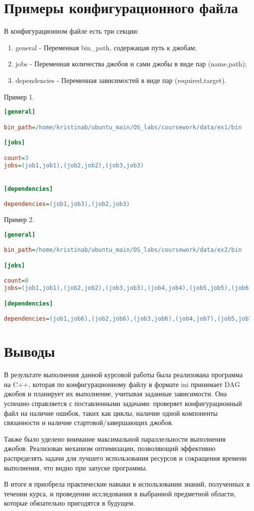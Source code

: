 \documentclass[a4paper, 12pt]{article}
\begin{document}
\newpage
\section{Примеры конфигурационного файла}
В конфигурационном файле есть три секции:
\begin{enumerate}
    \item general - Переменная bin\_path, содержащая путь к джобам;
    \item jobs - Переменная количества джобов и сами джобы в виде пар (name,path);
    \item dependencies - Переменная зависимостей в виде пар (required,target).
\end{enumerate}

Пример 1.
\begin{lstlisting}[language=ini]
[general]

bin_path=/home/kristinab/ubuntu_main/OS_labs/coursework/data/ex1/bin

[jobs]

count=3
jobs=(job1,job1),(job2,job2),(job3,job3)


[dependencies]

dependencies=(job1,job3),(job2,job3)
\end{lstlisting}

Пример 2.
\begin{lstlisting}[language=ini]
[general]

bin_path=/home/kristinab/ubuntu_main/OS_labs/coursework/data/ex2/bin

[jobs]

count=8
jobs=(job1,job1),(job2,job2),(job3,job3),(job4,job4),(job5,job5),(job6,job6),(job7,job7),(job8,job8)

[dependencies]

dependencies=(job1,job6),(job2,job6),(job3,job6),(job4,job7),(job5,job7),(job6,job8),(job7,job8)
\end{lstlisting}

\newpage

\section{Выводы}

В результате выполнения данной курсовой работы была реализована программа на C++, которая по конфигурационному файлу в формате ini принимает DAG джобов и планирует их выполнение, учитывая заданные зависимости. Она успешно справляется с поставленными задачами: проверяет конфигурационный файл на наличие ошибок, таких как циклы, наличие одной компоненты связанности и наличие стартовой/завершающих джобов. 

Также было уделено внимание максимальной параллельности выполнения джобов. Реализован механизм оптимизации, позволяющий эффективно распределять задачи для лучшего использования ресурсов и сокращения времени выполнения, что видно при запуске программы.

В итоге я приобрела практические навыки в использовании знаний, полученных в течении курса, и проведении исследования в выбранной предметной области, которые обязательно пригодятся в будущем.
\end{document}

